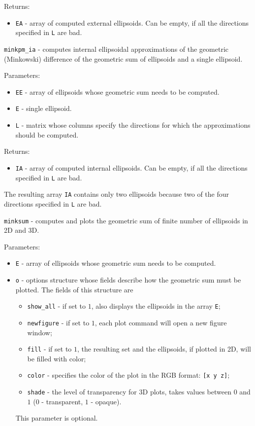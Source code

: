 \documentclass{report}
\begin{document}
Returns:
\begin{itemize}
\item {\tt EA} - array of computed external ellipsoids. Can be empty, if
all the directions specified in {\tt L} are bad.
\end{itemize}



\newpage

{\Large {\tt minkpm\_ia}} - computes internal ellipsoidal approximations
of the geometric (Minkowski) difference of the geometric sum of ellipsoids
and a single ellipsoid.

Parameters:
\begin{itemize}
\item {\tt EE} - array of ellipsoids whose geometric sum needs to be computed.
\item {\tt E} - single ellipsoid.
\item {\tt L} - matrix whose columns specify the directions for which
the approximations should be computed.
\end{itemize}

Returns:
\begin{itemize}
\item {\tt IA} - array of computed internal ellipsoids. Can be empty, if
all the directions specified in {\tt L} are bad.
\end{itemize}


The resulting array {\tt IA} contains only two ellipsoids because two
of the four directions specified in {\tt L} are bad.

\newpage

{\Large {\tt minksum}} - computes and plots the geometric sum of finite
number of ellipsoids in 2D and 3D.

Parameters:
\begin{itemize}
\item {\tt E} - array of ellipsoids whose geometric sum needs to be computed.
\item {\tt o} - options structure whose fields describe how the geometric
sum must be plotted. The fields of this structure are
\begin{itemize}
\item {\tt show\_all} - if set to $1$, also displays the ellipsoids in the
array {\tt E};
\item {\tt newfigure} - if set to $1$, each plot command will open a new
figure window;
\item {\tt fill} - if set to $1$, the resulting set and the ellipsoids,
if plotted in 2D, will be filled with color;
\item {\tt color} - specifies the color of the plot in the RGB format:
{\tt [x y z]};
\item {\tt shade} - the level of transparency for 3D plots, takes values
between $0$ and $1$ ($0$ - transparent, $1$ - opaque).
\end{itemize}
This parameter is optional.
\end{itemize}
\end{document}
